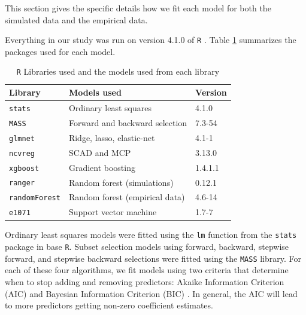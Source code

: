 \documentclass[final,onefignum,onetabnum]{siuro210301}
\begin{document}
	This section gives the specific details how we fit each model for both the simulated data and the empirical data.

	 Everything in our study was run on version 4.1.0 of \lstinline!R! \cite{r}. Table \ref{tab:model-libraries} summarizes the packages used for each model.
	 
	\begin{table}[h]
		\centering
		\caption{\lstinline!R! Libraries used and the models used from each library}
		\label{tab:model-libraries}
		\begin{tabular}{lll}\hline
			\textbf{Library}    	  & \textbf{Models used}                                 & \textbf{Version} \\ \hline
			\lstinline!stats! \cite{r}   	  & Ordinary least squares                               & 4.1.0            \\
			\lstinline!MASS! \cite{venables2002mass}   	  & Forward and backward selection                       & 7.3-54           \\
			\lstinline!glmnet! \cite{friedman2010regularization} 	  & Ridge, lasso, elastic-net                            & 4.1-1            \\
			\lstinline!ncvreg! \cite{breheny2011ncvreg}	      & SCAD and MCP                                         & 3.13.0           \\
			\lstinline!xgboost! \cite{chen2021xgboost}	  & Gradient boosting                                    & 1.4.1.1          \\
			\lstinline!ranger! \cite{wright2017ranger} 	  & Random forest (simulations)                          & 0.12.1           \\
			\lstinline!randomForest! \cite{liaw2002rf} & Random forest (empirical data)                       & 4.6-14           \\
			\lstinline!e1071! \cite{meyer2021e1071}  	  & Support vector machine                               & 1.7-7            \\\hline
		\end{tabular}
	\end{table}
	
	Ordinary least squares models were fitted using the \lstinline!lm! function from the \lstinline!stats! package in base \lstinline!R!. Subset selection models using forward, backward, stepwise forward, and stepwise backward selections were fitted using the \lstinline!MASS! library. For each of these four algorithms, we fit models using two criteria that determine when to stop adding and removing predictors: Akaike Information Criterion (AIC) and Bayesian Information Criterion (BIC) \cite{akaike1998information, schwarz1978estimating}. In general, the AIC will lead to more predictors getting non-zero coefficient estimates.
	
\end{document}
